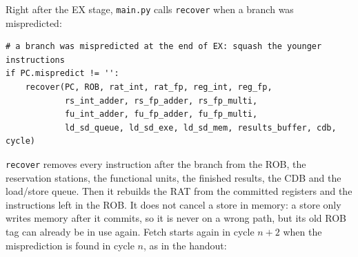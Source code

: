 \documentclass[11pt]{article}
\renewcommand{\_}{\origunderscore\allowbreak}
\begin{document}
Right after the EX stage, \texttt{main.py} calls \texttt{recover} when a branch was mispredicted:

\begin{lstlisting}
# a branch was mispredicted at the end of EX: squash the younger instructions
if PC.mispredict != '':
    recover(PC, ROB, rat_int, rat_fp, reg_int, reg_fp,
            rs_int_adder, rs_fp_adder, rs_fp_multi,
            fu_int_adder, fu_fp_adder, fu_fp_multi,
            ld_sd_queue, ld_sd_exe, ld_sd_mem, results_buffer, cdb, cycle)
\end{lstlisting}

\texttt{recover} removes every instruction after the branch from the ROB, the reservation
stations, the functional units, the finished results, the CDB and the load/store queue. Then it
rebuilds the RAT from the committed registers and the instructions left in the ROB. It does not
cancel a store in memory: a store only writes memory after it commits, so it is never on a wrong
path, but its old ROB tag can already be in use again. Fetch starts again in cycle $n+2$ when the
misprediction is found in cycle $n$, as in the handout:
\end{document}
